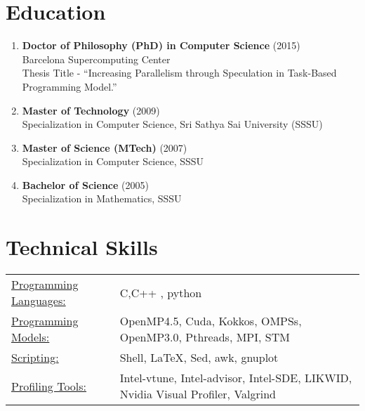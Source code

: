 \documentclass[margin]{res}
\begin{document}
\begin{resume}
\section{Education}
%
\begin{enumerate}
	   \item {\bf Doctor of Philosophy (PhD)  in Computer Science } (2015) \\
		Barcelona Supercomputing Center \\
		Thesis Title - \enquote{Increasing Parallelism through Speculation in Task-Based Programming Model.}\\
%
	   \item {\bf Master of Technology }(2009) \\
		Specialization in Computer Science, Sri Sathya Sai University (SSSU) \\
%
    \item {\bf Master of Science (MTech) }(2007) \\
		Specialization in Computer Science, SSSU
%
	   \item {\bf Bachelor of Science} (2005) \\
		Specialization in Mathematics, SSSU
%
\end{enumerate}

\section{Technical Skills}
   \begin{tabular}{l p{3in}}
	\underline{Programming Languages:} & C\smallskip ,C++ \smallskip, python \smallskip \\
       \underline{Programming Models:} & OpenMP4.5\smallskip, Cuda\smallskip, Kokkos\smallskip, OMPSs\smallskip, OpenMP3.0\smallskip, Pthreads\smallskip, MPI\smallskip, STM\\
	\underline{Scripting:} & Shell\smallskip, LaTeX\smallskip , Sed\smallskip, awk\smallskip, gnuplot\\
       \underline{Profiling Tools:} &Intel-vtune\smallskip, Intel-advisor\smallskip, Intel-SDE\smallskip, LIKWID\smallskip, Nvidia Visual Profiler\smallskip, Valgrind\smallskip
 \end{tabular}
%

\end{resume}
\end{document}
